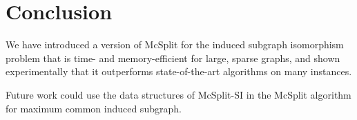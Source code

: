 \FloatBarrier

\section{Conclusion}

We have introduced a version of McSplit for the induced subgraph isomorphism problem that is time- and memory-efficient for large, sparse graphs, and shown experimentally that it outperforms state-of-the-art algorithms on many instances.

Future work could use the data structures of McSplit-SI in the McSplit algorithm for maximum common induced subgraph.
